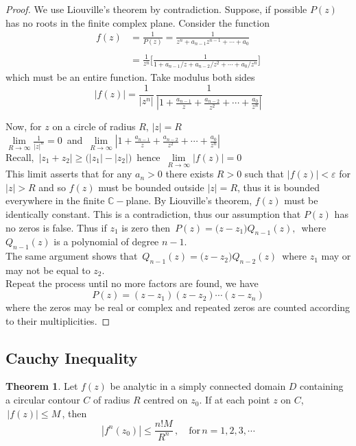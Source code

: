 \documentclass[11pt,a4paper]{article}
\theoremstyle{definition}
\newtheorem{thm}{Theorem}[section]
\begin{document}
\begin{proof}
We use Liouville's theorem by contradiction. Suppose, if possible $P(z)$ has no roots in the finite complex plane. Consider the function
\begin{align*}
f(z) & = \frac{1}{P(z)} = \frac{1}{z^n + a_{n-1}z^{n - 1} + \cdots + a_0}\\\\
& = \frac{1}{z^n}\Big[\frac{1}{1 + a_{n-1}/z + a_{n-2}/z^2 + \cdots + a_0/z^n}\Big]
\end{align*}
which must be an entire function. Take modulus both sides
$$\left|f(z)\right| = \frac{1}{\left|z^n\right|}\,\frac{1}{\left|1 + \frac{a_{n-1}}{z} + \frac{a_{n-2}}{z^2} + \cdots + \frac{a_0}{z^n}\right|}$$


Now, for $z$ on a circle of radius $R,\,
\left|z\right| = R$\\

$\lim\limits_{R\rightarrow \infty} \frac{1}{\left|z\right|^n} = 0\,$ and  $\,\lim\limits_{R\rightarrow \infty}\left|1 + \frac{a_{n-1}}{z} + \frac{a_{n-2}}{z^2} + \cdots + \frac{a_0}{z^n}\right|$\\

Recall, $\, \left|z_1 + z_2\right|\geq \Big(\left|z_1\right| - \left|z_2\right|\Big)\,$ hence $\, \lim\limits_{R\rightarrow \infty}\left|f(z)\right| = 0$\\



This limit asserts that for any $a_n > 0$ there exists $R>0$ such that $\left|f(z)\right| <\varepsilon$ for $\left|z\right| > R$ and so $f(z)$ must be bounded outside $\left|z\right| = R$, thus it is bounded everywhere in the finite $\mathbb{C}-$plane. By Liouville's theorem, $f(z)$ must be identically constant. This is a contradiction, thus our assumption that $P(z)$ has no zeros is false. Thus if $z_1$ is zero then $\, P(z) = \big(z - z_1\big)Q_{n-1}(z),\,$ where $Q_{n-1}(z)$ is a polynomial of degree $n-1$.\\
The same argument shows that $\, Q_{n-1}(z) = \big(z-z_2\big)Q_{n-2}(z)\,$ where $z_1$ may or may not be equal to $z_2$.\\
Repeat the process until no more factors are found, we have $$P(z) = (z-z_1)(z-z_2) \cdots(z-z_n)$$where the zeros may be real or complex and repeated zeros are counted according to their multiplicities.
\end{proof}

\pagebreak
{\color[wave]{485}\subsection{Cauchy Inequality}}
\begin{thm}
Let $f(z)$ be analytic in a simply connected domain $D$ containing a circular contour $C$ of radius $R$ centred on $z_0$. If at each point $z$ on $C$, $\,\left|f(z)\right| \leq M\,$, then $$\left|f^n(z_0)\right| \leq \frac{n! M}{R^n}\,, \quad  \text{for}\, n = 1, 2, 3, \cdots$$\\
\end{thm}
\end{document}
